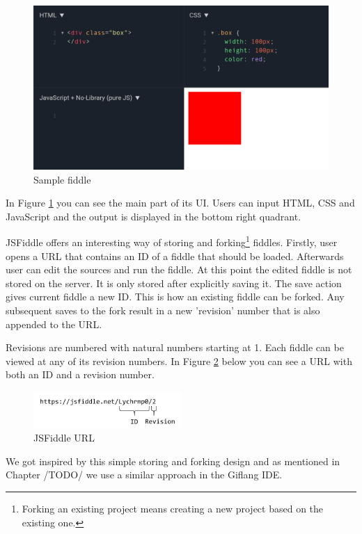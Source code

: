 {\begin{figure}[!hbt]
    \centering
	\includegraphics[width=\textwidth]{../img/jsfiddle}
	\caption{Sample fiddle}
	\label{fig:chap1:jsfiddle}
\end{figure}

In Figure \ref{fig:chap1:jsfiddle} you can see the main part of its UI. Users can input HTML, CSS and JavaScript and the output is displayed in the
bottom right quadrant.

JSFiddle offers an interesting way of storing and forking\footnote{Forking an existing project means creating a new project based on the existing one.}
fiddles. Firstly, user opens a URL that contains an ID of a fiddle that should be loaded. Afterwards user can edit the sources and run the fiddle.
At this point the edited fiddle is not stored on the server. It is only stored after explicitly saving it. The save action gives current fiddle a new ID.
This is how an existing fiddle can be forked. Any subsequent saves to the fork result in a  new 'revision' number that is also appended to the URL.

Revisions are numbered with natural numbers starting at 1. Each fiddle can be viewed at any of its revision numbers. In Figure \ref{fig:chap1:jsfiddle_url}
below you can see a URL with both an ID and a revision number.
\begin{figure}[!hbt]
    \centering
	\includegraphics[width=0.5\textwidth]{../img/jsfiddle_url}
	\caption{JSFiddle URL}
	\label{fig:chap1:jsfiddle_url}
\end{figure}

We got inspired by this simple storing and forking design and as mentioned in Chapter /TODO/ we use a similar approach in the Giflang IDE.

}
